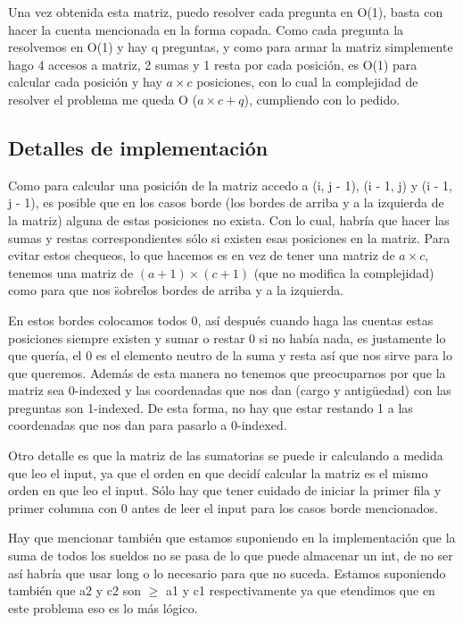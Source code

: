 Una vez obtenida esta matriz, puedo resolver cada pregunta en O(1), basta con hacer la cuenta mencionada en la forma copada. Como cada pregunta la resolvemos en O(1) y hay q preguntas, y como para armar la matriz simplemente hago 4 accesos a matriz, 2 sumas y 1 resta por cada posición, es O(1) para calcular cada posición y hay $a \times c$ posiciones, con lo cual la complejidad de resolver el problema me queda O ($a \times c + q$), cumpliendo con lo pedido.

\subsection {Detalles de implementación}

Como para calcular una posición de la matriz accedo a (i, j - 1),  (i - 1, j) y (i - 1, j - 1), es posible que en los casos borde (los bordes de arriba y a la izquierda de la matriz) alguna de estas posiciones no exista. Con lo cual, habría que hacer las sumas y restas correspondientes sólo si existen esas posiciones en la matriz. Para evitar estos chequeos, lo que hacemos es en vez de tener una matriz de $a \times c$, tenemos una matriz de $(a + 1) \times (c + 1)$ (que no modifica la complejidad) como para que nos \"sobre\" los bordes de arriba y a la izquierda. \newline

En estos bordes colocamos todos 0, así después cuando haga las cuentas estas posiciones siempre existen y sumar o restar 0 si no había nada, es justamente lo que quería, el 0 es el elemento neutro de la suma y resta así que nos sirve para lo que queremos. Además de esta manera no tenemos que preocuparnos por que la matriz sea 0-indexed y las coordenadas que nos dan (cargo y antigüedad) con las preguntas son 1-indexed. De esta forma, no hay que estar restando 1 a las coordenadas que nos dan para pasarlo a 0-indexed.\newline

Otro detalle es que la matriz de las sumatorias se puede ir calculando a medida que leo el input, ya que el orden en que decidí calcular la matriz es el mismo orden en que leo el input. Sólo hay que tener cuidado de iniciar la primer fila y primer columna con 0 antes de leer el input para los casos borde mencionados. \newline

Hay que mencionar también que estamos suponiendo en la implementación que la suma de todos los sueldos no se pasa de lo que puede almacenar un int, de no ser así habría que usar long o lo necesario para que no suceda. Estamos suponiendo también que a2 y c2 son $\geq$ a1 y c1 respectivamente ya que etendimos que en este problema eso es lo más lógico.

